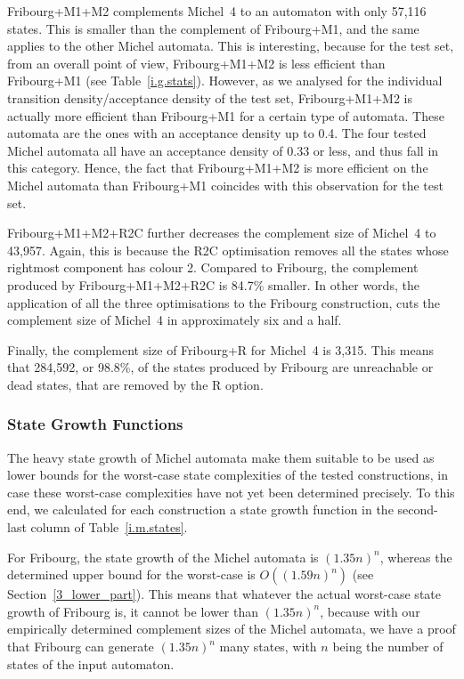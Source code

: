 Fribourg+M1+M2 complements Michel~4 to an automaton with only 57,116 states. This is smaller than the complement of Fribourg+M1, and the same applies to the other Michel automata. This is interesting, because for the \goal{} test set,  from an overall point of view, Fribourg+M1+M2 is less efficient than Fribourg+M1 (see Table~\ref{i.g.stats}). However, as we analysed for the individual transition density/acceptance density of the \goal{} test set, Fribourg+M1+M2 is actually more efficient than Fribourg+M1 for a certain type of automata. These automata are the ones with an acceptance density up to 0.4. The four tested Michel automata all have an acceptance density of 0.33 or less, and thus fall in this category. Hence, the fact that Fribourg+M1+M2 is more efficient on the Michel automata than Fribourg+M1 coincides with this observation for the \goal{} test set.

Fribourg+M1+M2+R2C further decreases the complement size of Michel~4 to 43,957. Again, this is because the R2C optimisation removes all the states whose rightmost component has colour 2. Compared to Fribourg, the complement produced by Fribourg+M1+M2+R2C is 84.7\% smaller. In other words, the application of all the three optimisations to the Fribourg construction, cuts the complement size of Michel~4 in approximately six and a half.

Finally, the complement size of Fribourg+R for Michel~4 is 3,315. This means that 284,592, or 98.8\%, of the states produced by Fribourg are unreachable or dead states, that are removed by the R option.

\subsubsection{State Growth Functions}
The heavy state growth of Michel automata make them suitable to be used as lower bounds for the worst-case state complexities of the tested constructions, in case these worst-case complexities have not yet been determined precisely. To this end, we calculated for each construction a state growth function in the second-last column of Table~\ref{i.m.states}.

For Fribourg, the state growth of the Michel automata is $(1.35n)^n$, whereas the determined upper bound for the worst-case is $O((1.59n)^n)$ (see Section~\ref{3_lower_part}). This means that whatever the actual worst-case state growth of Fribourg is, it cannot be lower than $(1.35n)^n$, because with our empirically determined complement sizes of the Michel automata, we have a proof that Fribourg can generate $(1.35n)^n$ many states, with $n$ being the number of states of the input automaton.

